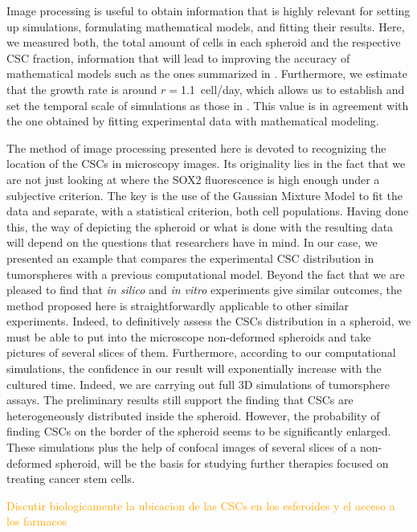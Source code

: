 \documentclass[fleqn,10pt]{wlscirep}
\begin{document}
Image processing is useful to obtain information that is highly relevant for setting up simulations, formulating mathematical models, and fitting their results. Here, we measured both, the total amount of cells in each spheroid and the respective CSC fraction, information that will lead to improving the accuracy of mathematical models such as the ones summarized in \cite{barberis2021diff}. Furthermore, we estimate that the growth rate is around $r=$\SI{1.1}{cell/day}, which allows us to establish and set the temporal scale of simulations as those in \cite{barberis2021percolation}. This value is in agreement with the one obtained by fitting experimental data with mathematical modeling\cite{benitez2021}. 


The method of image processing presented here is devoted to recognizing the location of the CSCs in microscopy images. Its originality lies in the fact that we are not just looking at where the SOX2 fluorescence is high enough under a subjective criterion. The key is the use of the Gaussian Mixture Model to fit the data and separate, with a statistical criterion, both cell populations. Having done this, the way of depicting the spheroid or what is done with the resulting data will depend on the questions that researchers have in mind. In our case, we presented an example that compares the experimental CSC distribution in tumorspheres with a previous computational model. Beyond the fact that we are pleased to find that \emph{in silico} and \emph{in vitro} experiments give similar outcomes, the method proposed here is straightforwardly applicable to other similar experiments. Indeed, to definitively assess the CSCs distribution in a spheroid, we must be able to put into the microscope non-deformed spheroids and take pictures of several slices of them.
Furthermore, according to our computational simulations, the confidence in our result will exponentially increase with the cultured time. Indeed, we are carrying out full 3D simulations of tumorsphere assays. The preliminary results still support the finding that CSCs are heterogeneously distributed inside the spheroid. However, the probability of finding CSCs on the border of the spheroid seems to be significantly enlarged. These simulations plus the help of confocal images of several slices of a non-deformed spheroid, will be the basis for studying further therapies focused on treating cancer stem cells.      

\textcolor{orange}{Discutir biologicamente la ubicacion de las CSCs en los esferoides y el acceso a los farmacos}
\end{document}
